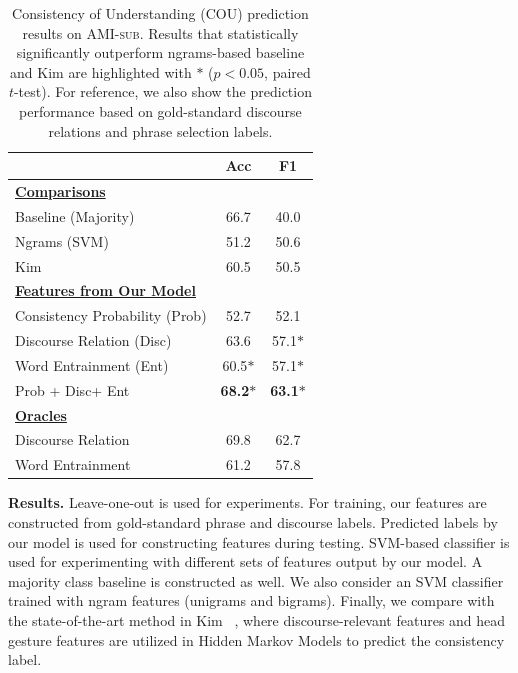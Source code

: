 \begin{table}[t]
\centering
\fontsize{9}{10}\selectfont
\setlength{\tabcolsep}{1.5mm}
\begin{tabular}{|l|c|c|}
    \hline
        & \textbf{Acc} & \textbf{F1} \\ \hline
        \underline{\textbf{Comparisons}} && \\
        Baseline (Majority) & 66.7 & 40.0  \\ 
        Ngrams (SVM) & 51.2 & 50.6  \\ 
		Kim \cite{kim2016improving} & 60.5 & 50.5 \\ \hline\hline
		        
        \underline{\textbf{Features from Our Model}}&&  \\ 
        Consistency Probability (Prob) & 52.7 & 52.1 \\ 
        Discourse Relation (Disc) & 63.6 & 57.1$\ast$  \\ 
        Word Entrainment (Ent) & 60.5$\ast$ & 57.1$\ast$\\ 
        Prob + Disc+ Ent & {\bf 68.2}$\ast$ & {\bf 63.1}$\ast$  \\ \hline\hline

        \underline{\textbf{Oracles}}&&  \\ 
        Discourse Relation & 69.8 & 62.7 \\ 
        Word Entrainment & 61.2 & 57.8 \\ \hline
\end{tabular}
\caption{Consistency of Understanding (COU) prediction results on \textsc{AMI-sub}. Results that statistically significantly outperform ngrams-based baseline and Kim \cite{kim2016improving} are highlighted with $\ast$ ($p < 0.05$, paired $t$-test). %
For reference, we also show the prediction performance based on gold-standard discourse relations and phrase selection labels.}
\label{tab:consistency}
\end{table}

\noindent \textbf{Results.} 
Leave-one-out is used for experiments. For training, our features are constructed from gold-standard phrase and discourse labels. Predicted labels by our model is used for constructing features during testing. SVM-based classifier is used for experimenting with different sets of features output by our model. 
A majority class baseline is constructed as well. We also consider an SVM classifier trained with ngram features (unigrams and bigrams). Finally, we compare with the state-of-the-art method in Kim ~\cite{kim2016improving}, where discourse-relevant features and head gesture features are utilized in Hidden Markov Models to predict the consistency label.

